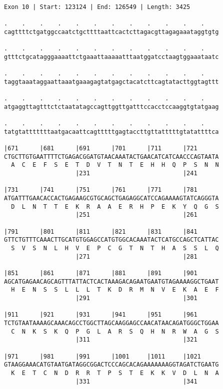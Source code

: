 \documentclass{article}
\begin{document}
\begin{Verbatim}
Exon 10 | Start: 123124 | End: 126549 | Length: 3425
 
.    .    .    .    .    .    .    .    .    .    .    .    
cagttttctgatggccaatctgcttttaattcactcttagacgttagagaaataggtgtg
  
.    .    .    .    .    .    .    .    .    .    .    .    
gtttctgcatagggaaaattctgaaattaaaaatttaatggatcctaagtggaaataatc
  
.    .    .    .    .    .    .    .    .    .    .    .    
taggtaaataggaattaaatgaaagagtatgagctacatcttcagtatacttggtagttt
  
.    .    .    .    .    .    .    .    .    .    .    .    
atgaggttagtttctctaatatagccagttggttgatttccacctccaaggtgtatgaag
  
.    .    .    .    .    .    .    .    .    .    .    .    
tatgtatttttttaatgacaattcagtttttgagtaccttgttatttttgtatattttca
  
|671      |681      |691      |701      |711      |721      
CTGCTTGTGAATTTTCTGAGACGGATGTAACAAATACTGAACATCATCAACCCAGTAATA
  A  C  E  F  S  E  T  D  V  T  N  T  E  H  H  Q  P  S  N  N
                    |231                          |241      
  
|731      |741      |751      |761      |771      |781      
ATGATTTGAACACCACTGAGAAGCGTGCAGCTGAGAGGCATCCAGAAAAGTATCAGGGTA
  D  L  N  T  T  E  K  R  A  A  E  R  H  P  E  K  Y  Q  G  S
                    |251                          |261      
  
|791      |801      |811      |821      |831      |841      
GTTCTGTTTCAAACTTGCATGTGGAGCCATGTGGCACAAATACTCATGCCAGCTCATTAC
  S  V  S  N  L  H  V  E  P  C  G  T  N  T  H  A  S  S  L  Q
                    |271                          |281      
  
|851      |861      |871      |881      |891      |901      
AGCATGAGAACAGCAGTTTATTACTCACTAAAGACAGAATGAATGTAGAAAAGGCTGAAT
  H  E  N  S  S  L  L  L  T  K  D  R  M  N  V  E  K  A  E  F
                    |291                          |301      
  
|911      |921      |931      |941      |951      |961      
TCTGTAATAAAAGCAAACAGCCTGGCTTAGCAAGGAGCCAACATAACAGATGGGCTGGAA
  C  N  K  S  K  Q  P  G  L  A  R  S  Q  H  N  R  W  A  G  S
                    |311                          |321      
  
|971      |981      |991      |1001     |1011     |1021     
GTAAGGAAACATGTAATGATAGGCGGACTCCCAGCACAGAAAAAAAGGTAGATCTGAATG
  K  E  T  C  N  D  R  R  T  P  S  T  E  K  K  V  D  L  N  A
                    |331                          |341      
  

\end{Verbatim}
\end{document}
